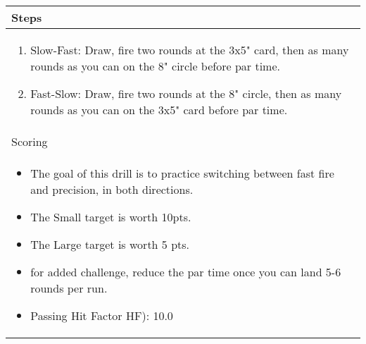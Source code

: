 \documentclass[../Cover.tex]{subfiles}
\begin{document}
	\begin{tabular}{ | p{} |}
		\hline
		\rowcolor[HTML]{C0C0C0}Steps\\ 
		\hline
		\tiny \begin{enumerate}[topsep=0pt, partopsep=0pt]
			\item Slow-Fast: Draw, fire two rounds at the 3x5" card, then as many rounds as you can on the 8" circle before par time.
			\item Fast-Slow: Draw, fire two rounds at the 8" circle, then as many rounds as you can on the 3x5" card before par time.
		\end{enumerate}		
		\\ [0.25\textheight]
		\hline
		\rowcolor[HTML]{C0C0C0}Scoring \\
		\hline
		\tiny \begin{itemize}[topsep=0pt, partopsep=0pt]
			\item The goal of this drill is to practice switching between fast fire and precision, in both directions.
			\item The Small target is worth 10pts.
			\item The Large target is worth 5 pts.
			\item for added challenge, reduce the par time once you can land 5-6 rounds per run.
			\item Passing Hit Factor HF): 10.0
		\end{itemize}		
		\\ [0.25\textheight]
		\hline
	\end{tabular}
\end{document}
